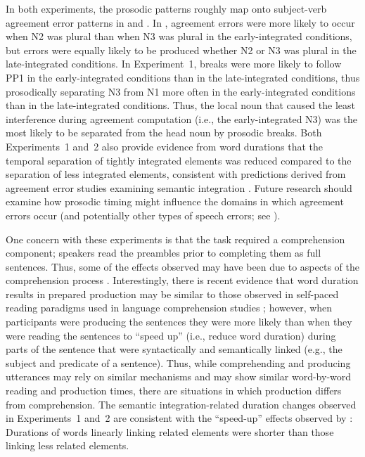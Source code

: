 \documentclass[12pt,titlepage]{article}
\newcommand{\NOTE}[1]{\textbf{*** #1 ***}}  %
\newcommand{\IGNORE}[1]{} %
\begin{document}
In both experiments, the prosodic patterns roughly map onto subject-verb agreement error patterns in  and .  In \citeauthor{GillespiePearlmutter11}, agreement errors were more likely to occur when N2 was plural than when N3 was plural in the early-integrated conditions, but errors were equally likely to be produced whether N2 or N3 was plural in the late-integrated conditions. In Experiment~1, breaks were more likely to follow PP1 in the early-integrated conditions than in the late-integrated conditions, thus prosodically separating N3 from N1 more often in the early-integrated conditions than in the late-integrated conditions. Thus, the local noun that caused the least interference during agreement computation (i.e., the early-integrated N3) was the most likely to be separated from the head noun by prosodic breaks. Both Experiments~1 and~2 also provide evidence from word durations that the temporal separation of tightly integrated elements was reduced compared to the separation of less integrated elements, consistent with predictions derived from agreement error studies examining semantic integration \cite{GillespiePearlmutter11, SolomonPearlmutter04}. Future research should examine how prosodic timing might influence the domains in which agreement errors occur (and potentially other types of speech errors; see ).


One concern with these experiments is that the task required a comprehension component; speakers read the preambles prior to completing them as full sentences.  Thus, some of the effects observed may have been due to aspects of the comprehension process \cite<for discussion of this concern see>{GillespiePearlmutter11, HaskellMacDonald03, HaskellMacDonald05}.  Interestingly, there is recent evidence that word duration results in prepared production may be similar to those observed in self-paced reading paradigms used in language comprehension studies \cite{SantiEtAlETAP11}; however, when participants were producing the sentences they were more likely than when they were reading the sentences to ``speed up'' (i.e., reduce word duration) during parts of the sentence that were syntactically and semantically linked (e.g., the subject and predicate of a sentence). Thus, while comprehending and producing utterances may rely on similar mechanisms and may show similar word-by-word reading and production times, there are situations in which production differs from comprehension. The semantic integration-related duration changes observed in Experiments~1 and~2 are consistent with the ``speed-up'' effects observed by : Durations of words linearly linking related elements were shorter than those linking less related elements.
\IGNORE{
\NOTE{I will provide more detail about the study above if we decide to keep something like this. I just don't have the paper yet (since it'll be in the same issue). I've already emailed the authors in hopes of getting more information.}}
\end{document}
